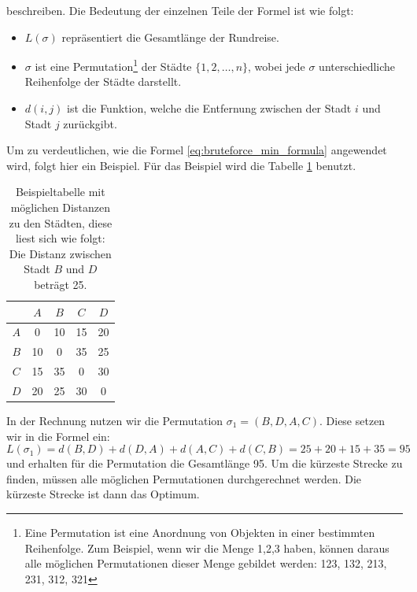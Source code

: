 beschreiben. Die Bedeutung der einzelnen Teile der Formel ist wie folgt:
\begin{itemize}
    \item \( L(\sigma) \) repräsentiert die Gesamtlänge der Rundreise.
    \item \( \sigma \) ist eine Permutation\footnote{
              Eine Permutation ist eine Anordnung von Objekten in einer bestimmten Reihenfolge.
              Zum Beispiel, wenn wir die Menge {1,2,3} haben, können daraus alle möglichen 
              Permutationen dieser Menge gebildet werden: 123, 132, 213, 231, 312, 321 
          }
%
          der Städte \( \{1, 2, \ldots, n\} \),
          wobei jede \( \sigma \) unterschiedliche Reihenfolge der Städte darstellt.
    \item \( d(i, j) \) ist die Funktion, welche die Entfernung zwischen der Stadt \( i \) und
          Stadt \( j \) zurückgibt.
\end{itemize}
\begin{beispiel}
    \label{buch:paper:varalg:subsection:bruteforce_calculate}
    Um zu verdeutlichen, wie die Formel \eqref{eq:bruteforce_min_formula}
    angewendet wird, folgt hier ein Beispiel. Für das Beispiel wird die Tabelle 
    \ref{tab:example_bruteforce_cities} benutzt.
    \begin{table}
        \centering
        \begin{tabular}{|c|c|c|c|c|}
            \hline
                & $A$ & $B$ & $C$ & $D$ \\ \hline
            $A$ & 0   & 10  & 15  & 20  \\ \hline
            $B$ & 10  & 0   & 35  & 25  \\ \hline
            $C$ & 15  & 35  & 0   & 30  \\ \hline
            $D$ & 20  & 25  & 30  & 0   \\ \hline
        \end{tabular}
        \caption{
            Beispieltabelle mit möglichen Distanzen zu den Städten, diese liest sich wie folgt:
            Die Distanz zwischen Stadt $B$ und $D$ beträgt 25.
        }
        \label{tab:example_bruteforce_cities}
    \end{table}
    In der Rechnung nutzen wir die Permutation $\sigma_1 = (B, D, A, C)$.
    Diese setzen wir in die Formel ein:
    \begin{equation}
        L(\sigma_1) = d(B, D) + d(D, A) + d(A, C) + d(C, B)
        =
        25 + 20 + 15 + 35 = 95
        \label{eq:bruteforce_min_formula_example}
    \end{equation}
    und erhalten für die Permutation die Gesamtlänge 95. Um die kürzeste Strecke zu finden,
    müssen alle möglichen Permutationen durchgerechnet werden. Die kürzeste Strecke ist dann
    das Optimum. 
\end{beispiel}
